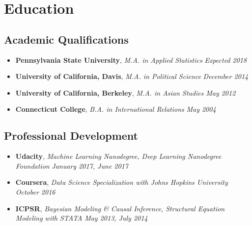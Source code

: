 \documentclass[10pt,a4paper,sans]{moderncv}        %
\begin{document}
\section{Education}



\subsection{Academic Qualifications}



\begin{itemize}

\item{\textbf{Pennsylvania State University}, \textit{M.A. in Applied Statistics}  \phantom{aaaaaaaaaaaaaaaaaaaaaaaaaaaaaaaaaaaaaaaaa} \textit{Expected 2018}}
\item{\textbf{University of California, Davis}, \textit{M.A. in Political Science} \phantom{aaaaaaaaaaaaaaaaaaaaaaaaaaaaaaaaaaaaaaaaa} \textit{December 2014}}
\item{\textbf{University of California, Berkeley}, \textit{M.A. in Asian Studies} \phantom{aaaaaaaaaaaaaaaaaaaaaaaaaaaaaaaaaaaaaaaaaaaaaa} \textit{May 2012}}
\item{\textbf{Connecticut College}, \textit{B.A. in International Relations}  \phantom{aaaaaaaaaaaaaaaaaaaaaaaaaaaaaaaaaaaaaaaaaaaaaaaaaa} \textit{May 2004}}

\end{itemize}

\vspace{1pt}

\subsection{Professional Development}

\vspace{1pt}

\begin{itemize}


\item{\textbf{Udacity}, \textit{Machine Learning Nanodegree, Deep Learning Nanodegree Foundation}  \phantom{aaaaaaaaaaaaa} \textit{January 2017, June 2017}}
\item{\textbf{Coursera}, \textit{Data Science Specialization with Johns Hopkins University}  \phantom{aaaaaaaaaaaaaaaaaaaaaaaaaaaaaaaaa} \textit{October 2016}}
\item{\textbf{ICPSR}, \textit{Bayesian Modeling \& Causal Inference, Structural Equation Modeling with STATA} \phantom{aaaaaaaaa}\textit{May 2013, July 2014}} 
\end{itemize}
\end{document}
